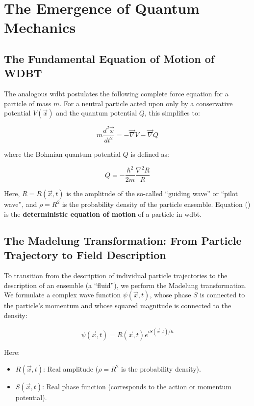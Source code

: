 \chapter{The Emergence of Quantum Mechanics}
\section{The Fundamental Equation of Motion of WDBT}
The analogous \gls{wdbt} postulates the following complete force equation for a particle of mass $m$. For a neutral particle acted upon only by a conservative potential $V(\vec{x})$ and the quantum potential $Q$, this simplifies to:

\begin{equation}
    \label{eq:deterministische_bewegungsgleichung}
    m \frac{d^2\vec{x}}{dt^2} = -\vec{\nabla} V - \vec{\nabla} Q
\end{equation}

where the Bohmian quantum potential $Q$ is defined as:

\begin{equation}
    \label{eq:quantenpotential}
    Q = -\frac{\hbar^2}{2m} \frac{\nabla^2 R}{R}
\end{equation}

Here, $R = R(\vec{x},t)$ is the amplitude of the so-called \enquote{guiding wave} or \enquote{pilot wave}, and $\rho = R^2$ is the probability density of the particle ensemble. Equation () is the \textbf{deterministic equation of motion} of a particle in \gls{wdbt}.

\section{The Madelung Transformation: From Particle Trajectory to Field Description}
\label{sec:madelung}
To transition from the description of individual particle trajectories to the description of an ensemble (a \enquote{fluid}), we perform the Madelung transformation. We formulate a complex wave function $\psi(\vec{x}, t)$, whose phase $S$ is connected to the particle's momentum and whose squared magnitude is connected to the density:

\begin{equation}
    \psi(\vec{x}, t) = R(\vec{x}, t)  e^{i S(\vec{x}, t) / \hbar}
\end{equation}

Here:

\begin{itemize}
    \item $R(\vec{x},t)$: Real amplitude ($\rho = R^2$ is the probability density).
    \item $S(\vec{x},t)$: Real phase function (corresponds to the action or momentum potential).
\end{itemize}

